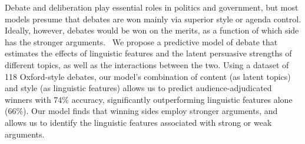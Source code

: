 Debate and deliberation play essential roles in politics and government, but most models presume that debates are won mainly via superior style or agenda control. Ideally, however, debates would be won on the merits, as a function of which side has the stronger arguments.  We propose a predictive model of debate that estimates the effects of linguistic features and the latent persuasive strengths of different topics, as well as the interactions between the two. Using a dataset of 118 Oxford-style debates, our model's combination of content (as latent topics) and style (as linguistic features) allows us to predict audience-adjudicated winners with 74\% accuracy, significantly outperforming linguistic features alone (66\%). Our model finds that winning sides employ stronger arguments, and allows us to identify the linguistic features associated with strong or weak arguments.